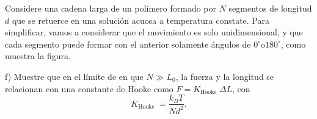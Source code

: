 Considere una cadena larga de un polímero formado por $N$ segmentos de longitud $d$ que se retuerce en una solución acuosa a temperatura constate. Para simplificar, vamos a considerar que el movimiento es solo unidimensional, y que cada segmento puede formar con el anterior solamente ángulos de $0^{\circ} \mathrm{o} 180^{\circ}$, como muestra la figura.



f) Muestre que en el límite de en que $N \gg L_0$, la fuerza y la longitud se relacionan con una constante de Hooke como $F=K_{\text {Hooke }} \Delta L$, con
$$
K_{\text {Hooke }}=\frac{k_B T}{N d^2} .
$$